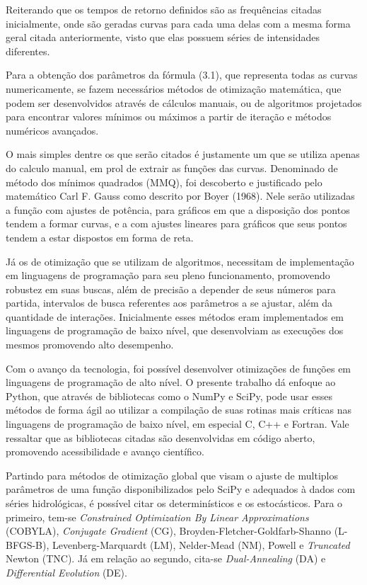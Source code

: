 \newpage

Reiterando que os tempos de retorno definidos são as frequências citadas inicialmente, onde são geradas curvas para cada uma delas com a mesma forma geral citada anteriormente, visto que elas possuem séries de intensidades diferentes.

Para a obtenção dos parâmetros da fórmula (3.1), que representa todas as curvas numericamente, se fazem necessários métodos de otimização matemática, que podem ser desenvolvidos através de cálculos manuais, ou de algoritmos projetados para encontrar valores mínimos ou máximos a partir de iteração e métodos numéricos avançados.

O mais simples dentre os que serão citados é justamente um que se utiliza apenas do calculo manual, em prol de extrair as funções das curvas. Denominado de método dos mínimos quadrados (MMQ), foi descoberto e justificado pelo matemático Carl F. Gauss como descrito por Boyer (1968). Nele serão utilizadas a função com ajustes de potência, para gráficos em que a disposição dos pontos tendem a formar curvas, e a com ajustes lineares para gráficos que seus pontos tendem a estar dispostos em forma de reta.

Já os de otimização que se utilizam de algoritmos, necessitam de implementação em linguagens de programação para seu pleno funcionamento, promovendo robustez em suas buscas, além de precisão a depender de seus números para partida, intervalos de busca referentes aos parâmetros a se ajustar, além da quantidade de interações. Inicialmente esses métodos eram implementados em linguagens de programação de baixo nível, que desenvolviam as execuções dos mesmos promovendo alto desempenho. 

Com o avanço da tecnologia, foi possível desenvolver otimizações de funções em linguagens de programação de alto nível. O presente trabalho dá enfoque ao Python, que através de bibliotecas como o NumPy e SciPy, pode usar esses métodos de forma ágil ao utilizar a compilação de suas rotinas mais críticas nas linguagens de programação de baixo nível, em especial C, C++ e Fortran. Vale ressaltar que as bibliotecas citadas são desenvolvidas em código aberto, promovendo acessibilidade e avanço científico. 

Partindo para métodos de otimização global que visam o ajuste de multiplos parâmetros de uma função disponibilizados pelo SciPy e adequados à dados com séries hidrológicas, é possível citar os determinísticos e os estocásticos. Para o primeiro, tem-se \textit{Constrained Optimization By Linear Approximations} (COBYLA), \textit{Conjugate Gradient} (CG), Broyden-Fletcher-Goldfarb-Shanno (L-BFGS-B), Levenberg-Marquardt (LM), Nelder-Mead (NM), Powell e \textit{Truncated} Newton (TNC). Já em relação ao segundo, cita-se \textit{Dual-Annealing} (DA) e \textit{Differential Evolution} (DE).


